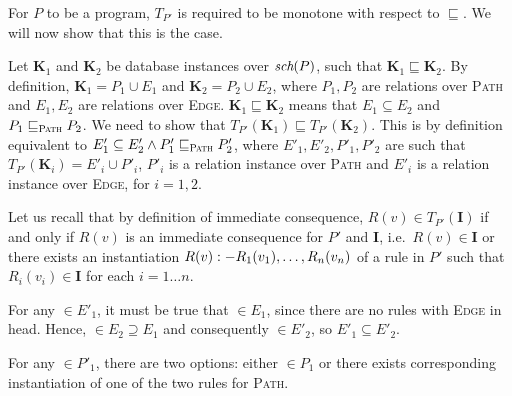 \begin{exmp}
For $P$ to be a \datalogra program, $T_{P'}$ is required to be monotone with respect to $\sqsubseteq$. We will now show that this is the case.

Let \textbf{K}$_1$ and \textbf{K}$_2$ be database instances over $\textit{sch}(P)$, such that $\textbf{K}_1 \sqsubseteq \textbf{K}_2$. By definition, $\textbf{K}_1 = P_1 \cup E_1$ and $\textbf{K}_2 = P_2 \cup E_2$, where $P_1, P_2$ are relations over \textsc{Path} and $E_1, E_2$ are relations over \textsc{Edge}.  $\textbf{K}_1 \sqsubseteq \textbf{K}_2$ means that $E_1 \subseteq E_2$ and $P_1 \sqsubseteq_\textsc{Path} P_2$. We need to show that $T_{P'}(\textbf{K}_1) \sqsubseteq T_{P'}(\textbf{K}_2)$. This is by definition equivalent to $E'_1 \subseteq E'_2 \wedge P'_1 \sqsubseteq_\textsc{Path} P'_2$, where $E'_1, E'_2, P'_1, P'_2$ are such that $T_{P'}(\textbf{K}_i) = E'_i \cup P'_i$, $P'_i$ is a relation instance over \textsc{Path} and $E'_i$ is a relation instance over \textsc{Edge}, for $i = 1, 2$.

Let us recall that by definition of immediate consequence, $R(v) \in T_{P'}(\textbf{I})$ if and only if $R(v)$ is an immediate consequence for $P'$ and \textbf{I}, i.e.\ $R(v) \in \textbf{I}$ or there exists an instantiation $R(v) :- R_1(v_1), \dots, R_n(v_n)$ of a rule in $P'$ such that $R_i(v_i) \in \textbf{I}$ for each $i = 1\dots n$.

For any $ \in E'_1$, it must be true that $ \in E_1$, since there are no rules with \textsc{Edge} in head. Hence, $ \in E_2 \supseteq E_1$ and consequently $ \in E'_2$, so $E'_1 \subseteq E'_2$.

For any $ \in P'_1$, there are two options: either $ \in P_1$ or there exists corresponding instantiation of one of the two rules for \textsc{Path}.







\end{exmp}

